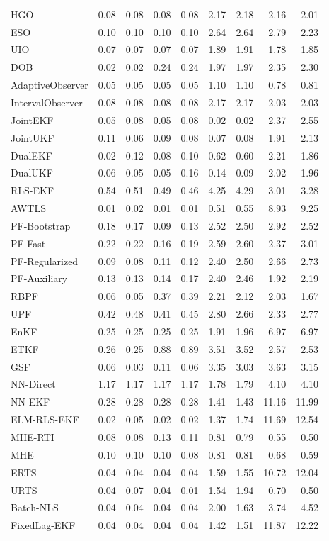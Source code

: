 \begin{longtable}{lrrrrrrrr}
HGO & 0.08 & 0.08 & 0.08 & 0.08 & 2.17 & 2.18 & 2.16 & 2.01 \\
ESO & 0.10 & 0.10 & 0.10 & 0.10 & 2.64 & 2.64 & 2.79 & 2.23 \\
UIO & 0.07 & 0.07 & 0.07 & 0.07 & 1.89 & 1.91 & 1.78 & 1.85 \\
DOB & 0.02 & 0.02 & 0.24 & 0.24 & 1.97 & 1.97 & 2.35 & 2.30 \\
AdaptiveObserver & 0.05 & 0.05 & 0.05 & 0.05 & 1.10 & 1.10 & 0.78 & 0.81 \\
IntervalObserver & 0.08 & 0.08 & 0.08 & 0.08 & 2.17 & 2.17 & 2.03 & 2.03 \\
JointEKF & 0.05 & 0.08 & 0.05 & 0.08 & 0.02 & 0.02 & 2.37 & 2.55 \\
JointUKF & 0.11 & 0.06 & 0.09 & 0.08 & 0.07 & 0.08 & 1.91 & 2.13 \\
DualEKF & 0.02 & 0.12 & 0.08 & 0.10 & 0.62 & 0.60 & 2.21 & 1.86 \\
DualUKF & 0.06 & 0.05 & 0.05 & 0.16 & 0.14 & 0.09 & 2.02 & 1.96 \\
RLS-EKF & 0.54 & 0.51 & 0.49 & 0.46 & 4.25 & 4.29 & 3.01 & 3.28 \\
AWTLS & 0.01 & 0.02 & 0.01 & 0.01 & 0.51 & 0.55 & 8.93 & 9.25 \\
PF-Bootstrap & 0.18 & 0.17 & 0.09 & 0.13 & 2.52 & 2.50 & 2.92 & 2.52 \\
PF-Fast & 0.22 & 0.22 & 0.16 & 0.19 & 2.59 & 2.60 & 2.37 & 3.01 \\
PF-Regularized & 0.09 & 0.08 & 0.11 & 0.12 & 2.40 & 2.50 & 2.66 & 2.73 \\
PF-Auxiliary & 0.13 & 0.13 & 0.14 & 0.17 & 2.40 & 2.46 & 1.92 & 2.19 \\
RBPF & 0.06 & 0.05 & 0.37 & 0.39 & 2.21 & 2.12 & 2.03 & 1.67 \\
UPF & 0.42 & 0.48 & 0.41 & 0.45 & 2.80 & 2.66 & 2.33 & 2.77 \\
EnKF & 0.25 & 0.25 & 0.25 & 0.25 & 1.91 & 1.96 & 6.97 & 6.97 \\
ETKF & 0.26 & 0.25 & 0.88 & 0.89 & 3.51 & 3.52 & 2.57 & 2.53 \\
GSF & 0.06 & 0.03 & 0.11 & 0.06 & 3.35 & 3.03 & 3.63 & 3.15 \\
NN-Direct & 1.17 & 1.17 & 1.17 & 1.17 & 1.78 & 1.79 & 4.10 & 4.10 \\
NN-EKF & 0.28 & 0.28 & 0.28 & 0.28 & 1.41 & 1.43 & 11.16 & 11.99 \\
ELM-RLS-EKF & 0.02 & 0.05 & 0.02 & 0.02 & 1.37 & 1.74 & 11.69 & 12.54 \\
MHE-RTI & 0.08 & 0.08 & 0.13 & 0.11 & 0.81 & 0.79 & 0.55 & 0.50 \\
MHE & 0.10 & 0.10 & 0.10 & 0.08 & 0.81 & 0.81 & 0.68 & 0.59 \\
ERTS & 0.04 & 0.04 & 0.04 & 0.04 & 1.59 & 1.55 & 10.72 & 12.04 \\
URTS & 0.04 & 0.07 & 0.04 & 0.01 & 1.54 & 1.94 & 0.70 & 0.50 \\
Batch-NLS & 0.04 & 0.04 & 0.04 & 0.04 & 2.00 & 1.63 & 3.74 & 4.52 \\
FixedLag-EKF & 0.04 & 0.04 & 0.04 & 0.04 & 1.42 & 1.51 & 11.87 & 12.22 \\
\bottomrule\end{longtable}
